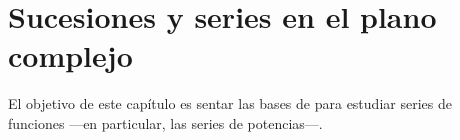 \chapter{Sucesiones y series en el plano complejo}

El objetivo de este capítulo es sentar las bases de para estudiar series de funciones ---en particular, las series de potencias---.